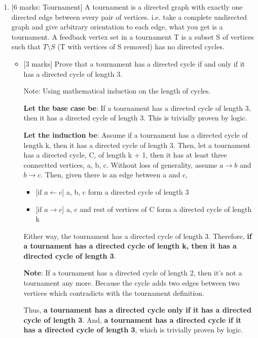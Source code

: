 \documentclass[12pt]{article}
\begin{document}
\begin{enumerate}
\begin{itemize}
\end{itemize}

\medskip

\item{} [6 marks: Tournament]
A tournament is a directed graph with exactly one directed edge between every pair of vertices. i.e. take a complete undirected graph and give arbitrary orientation to each edge, what you get is a tournament. A feedback vertex set in a tournament T is a subset S of vertices such that $T \setminus S$ (T with vertices of S removed) has no directed cycles.

\begin{itemize}
\item{}[3 marks]
Prove that a tournament has a directed cycle if and only if it has a directed cycle of length 3.

Note: Using mathematical induction on the length of cycles.

\textbf{Let the base case be}: If a tournament has a directed cycle of length 3, then it has a directed cycle of length 3. This is trivially proven by logic.

\textbf{Let the induction be}: Assume if a tournament has a directed cycle of length k, then it has a directed cycle of length 3. Then, let a tournament has a directed cycle, C, of length k + 1, then it has at least three connectted vertices, a, b, c. Without loss of generality, assume $a \to b$ and $b \to c$. Then, given there is an edge between a and c,
\begin{itemize}
\item{}[if $a \gets c$]
a, b, c form a directed cycle of length 3

\item{}[if $a \to c$]
a, c and rest of vertices of C form a directed cycle of length k
\end{itemize}
Either way, the tournament has a directed cycle of length 3. Therefore, \textbf{if a tournament has a directed cycle of length k, then it has a directed cycle of length 3}.

\textbf{Note}: If a tournament has a directed cycle of length 2, then it's not a tournament any more. Because the cycle adds two edges between two vertices which contradicts with the tournament definition.

Thus, \textbf{a tournament has a directed cycle only if it has a directed cycle of length 3}. And, \textbf{a tournament has a directed cycle if it has a directed cycle of length 3}, which is trivially proven by logic.


\end{itemize}
\end{enumerate}
\end{document}
